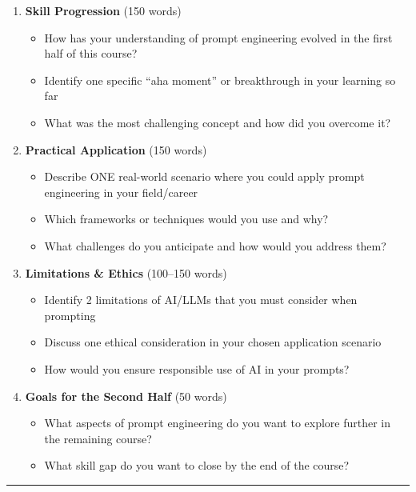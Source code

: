 \documentclass[11pt]{article}
\begin{document}
\begin{enumerate}[label=\alph*.]
    \item \textbf{Skill Progression} (150 words)
    \begin{itemize}
        \item How has your understanding of prompt engineering evolved in the first half of this course?
        \item Identify one specific ``aha moment'' or breakthrough in your learning so far
        \item What was the most challenging concept and how did you overcome it?
    \end{itemize}
    
    \item \textbf{Practical Application} (150 words)
    \begin{itemize}
        \item Describe ONE real-world scenario where you could apply prompt engineering in your field/career
        \item Which frameworks or techniques would you use and why?
        \item What challenges do you anticipate and how would you address them?
    \end{itemize}
    
    \item \textbf{Limitations \& Ethics} (100--150 words)
    \begin{itemize}
        \item Identify 2 limitations of AI/LLMs that you must consider when prompting
        \item Discuss one ethical consideration in your chosen application scenario
        \item How would you ensure responsible use of AI in your prompts?
    \end{itemize}
    
    \item \textbf{Goals for the Second Half} (50 words)
    \begin{itemize}
        \item What aspects of prompt engineering do you want to explore further in the remaining course?
        \item What skill gap do you want to close by the end of the course?
    \end{itemize}
\end{enumerate}

\hrule
\vspace{0.5cm}
\end{document}
